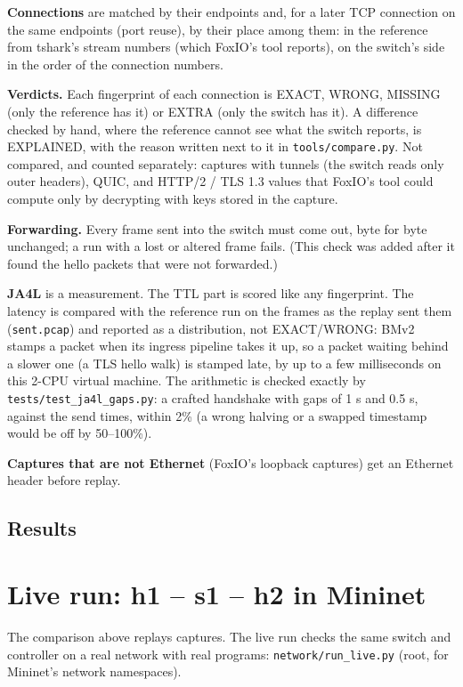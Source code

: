 \documentclass[11pt,a4paper]{article}
\newcommand{\code}[1]{\texttt{#1}}
\begin{document}
\textbf{Connections} are matched by their endpoints and, for a later TCP connection on the same endpoints (port
reuse), by their place among them: in the reference from tshark's stream numbers (which FoxIO's tool reports), on
the switch's side in the order of the connection numbers.

\textbf{Verdicts.} Each fingerprint of each connection is EXACT, WRONG, MISSING (only the reference has it) or EXTRA
(only the switch has it). A difference checked by hand, where the reference cannot see what the switch reports, is
EXPLAINED, with the reason written next to it in \code{tools/compare.py}. Not compared, and counted separately:
captures with tunnels (the switch reads only outer headers), QUIC, and HTTP/2 / TLS 1.3 values that FoxIO's tool
could compute only by decrypting with keys stored in the capture.

\textbf{Forwarding.} Every frame sent into the switch must come out, byte for byte unchanged; a run with a lost or
altered frame fails. (This check was added after it found the hello packets that were not forwarded.)

\textbf{JA4L} is a measurement. The TTL part is scored like any fingerprint. The latency is compared with the
reference run on the frames as the replay sent them (\code{sent.pcap}) and reported as a distribution, not
EXACT/WRONG: BMv2 stamps a packet when its ingress pipeline takes it up, so a packet waiting behind a slower one (a
TLS hello walk) is stamped late, by up to a few milliseconds on this 2-CPU virtual machine. The arithmetic is
checked exactly by \code{tests/test\_ja4l\_gaps.py}: a crafted handshake with gaps of 1 s and 0.5 s, against the
send times, within 2\% (a wrong halving or a swapped timestamp would be off by 50--100\%).

\textbf{Captures that are not Ethernet} (FoxIO's loopback captures) get an Ethernet header before replay.

\subsection*{Results}


\section{Live run: h1 -- s1 -- h2 in Mininet}
\label{sec:live}

The comparison above replays captures. The live run checks the same switch and controller on a real network with
real programs: \code{network/run\_live.py} (root, for Mininet's network namespaces).
\end{document}
